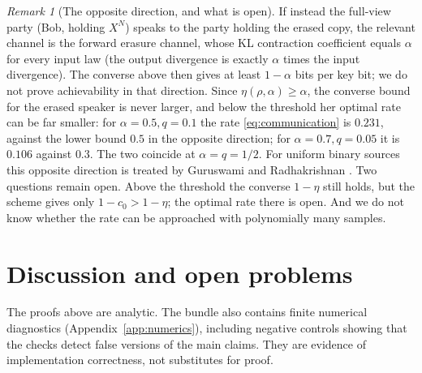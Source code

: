 \documentclass[11pt,a4paper]{article}
\numberwithin{equation}{section}
\theoremstyle{definition}
\theoremstyle{remark}
\newtheorem{remark}[theorem]{Remark}
\begin{document}
\begin{remark}[The opposite direction, and what is open]\label{rem:direction}
If instead the full-view party (Bob, holding \(X^N\)) speaks to the party
holding the erased copy, the relevant channel is the forward erasure
channel, whose KL contraction coefficient equals \(\alpha\) for every input
law (the output divergence is exactly \(\alpha\) times the input
divergence). The converse above then gives at least \(1-\alpha\) bits per
key bit; we do not prove achievability in that direction. Since
\(\eta(\rho,\alpha)\ge\alpha\), the converse bound for the erased speaker is
never larger, and below the threshold her optimal rate can be far smaller: for \(\alpha=0.5,q=0.1\) the rate
\eqref{eq:communication} is \(0.231\), against the lower bound \(0.5\) in
the opposite direction; for \(\alpha=0.7,q=0.05\) it is \(0.106\) against
\(0.3\). The two coincide at \(\alpha=q=1/2\). For uniform binary sources this
opposite direction is treated by Guruswami and Radhakrishnan
\cite{guruswami}.
Two questions remain open. Above the threshold the converse
\(1-\eta\) still holds, but the scheme gives only \(1-c_0>1-\eta\); the
optimal rate there is open. And we do not know whether the rate can be
approached with polynomially many samples.
\end{remark}

\section{Discussion and open problems}\label{sec:discussion}

The proofs above are analytic. The bundle also contains finite numerical
diagnostics (Appendix~\ref{app:numerics}), including negative controls
showing that the checks detect false versions of the main claims. They are
evidence of implementation correctness, not substitutes for proof.
\end{document}
